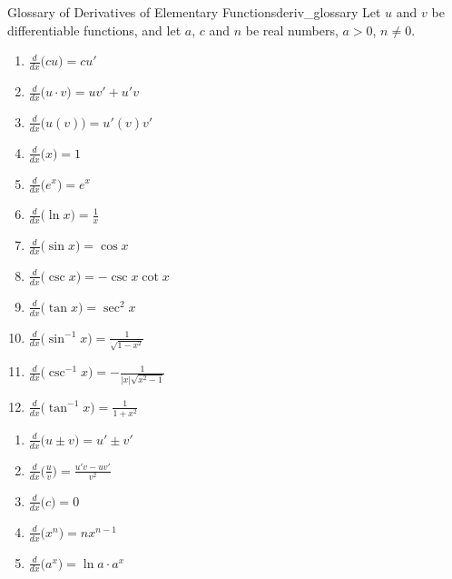 \begin{theorem}{Glossary of Derivatives of Elementary Functions}{deriv_glossary}
Let $u$ and $v$ be differentiable functions, and let $a$, $c$ and $n$ be real numbers, $a>0$, $n\neq 0$. \\
\noindent%

	\begin{minipage}{.5\textwidth}
	\begin{enumerate}
	\item		$\frac{d}{dx}\big(cu\big) = cu'$\addtocounter{enumi}{1}
	\item		$\frac{d}{dx}\big(u\cdot v\big) = uv'+u'v$\addtocounter{enumi}{1}
	\item		$\frac{d}{dx}\big(u(v)\big) = u'(v)v'$\addtocounter{enumi}{1}
	\item		$\frac{d}{dx}\big(x\big) = 1$\addtocounter{enumi}{1}
	\item		$\frac{d}{dx}\big(e^x\big) = e^x$\addtocounter{enumi}{1}
	\item		$\frac{d}{dx}\big(\ln x\big) = \frac{1}{x}$\addtocounter{enumi}{1}
	\item		$\frac{d}{dx}\big(\sin x\big) = \cos x$\addtocounter{enumi}{1}
	\item		$\frac{d}{dx}\big(\csc x\big) = -\csc x\cot x$\addtocounter{enumi}{1}
	\item		$\frac{d}{dx}\big(\tan x\big) = \sec^2x$\addtocounter{enumi}{1}
	\item		$\frac{d}{dx}\big(\sin^{-1}x\big) = \frac{1}{\sqrt{1-x^2}}$\addtocounter{enumi}{1}
	\item		$\frac{d}{dx}\big(\csc^{-1}x\big) = -\frac{1}{|x|\sqrt{x^2-1}}$\addtocounter{enumi}{1}
	\item		$\frac{d}{dx}\big(\tan^{-1}x\big) = \frac{1}{1+x^2}$\addtocounter{enumi}{1}
	\end{enumerate}
\end{minipage}
\begin{minipage}{.5\textwidth}
	\begin{enumerate}\addtocounter{enumi}{1}
	\item		$\frac{d}{dx}\big(u\pm v\big) = u'\pm v'$\addtocounter{enumi}{1}
	\item		$\frac{d}{dx}\big(\frac uv\big) = \frac{u'v-uv'}{v^2}$\addtocounter{enumi}{1}
	\item		$\frac{d}{dx}\big(c\big) = 0$\addtocounter{enumi}{1}
	\item		$\frac{d}{dx}\big(x^n\big) = nx^{n-1}$\addtocounter{enumi}{1}
	\item		$\frac{d}{dx}\big(a^x\big) = \ln a\cdot a^x$\addtocounter{enumi}{1}

\end{enumerate}
\end{minipage}
\end{theorem}
